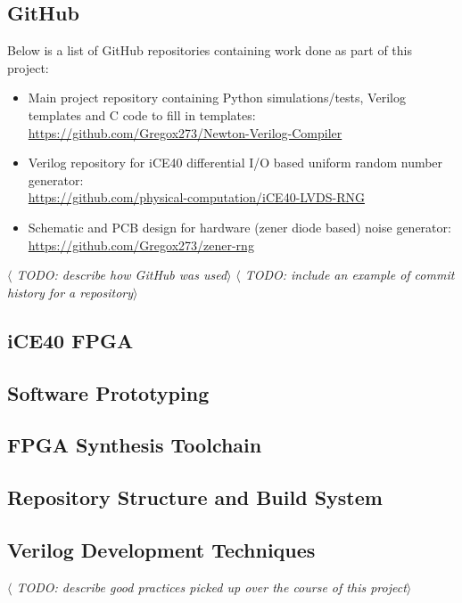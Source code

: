 \documentclass[12pt]{article}
\begin{document}
  \subsection{GitHub} \label{subsection:GitHub}
    Below is a list of GitHub repositories containing work done as part of this project:
    \begin{itemize}
        \item Main project repository containing Python simulations/tests, Verilog templates and C code to fill in templates:\\
        \url{https://github.com/Gregox273/Newton-Verilog-Compiler}
        \item Verilog repository for iCE40 differential I/O based uniform random number generator:\\
        \url{https://github.com/physical-computation/iCE40-LVDS-RNG}
        \item Schematic and PCB design for hardware (zener diode based) noise generator:\\
        \url{https://github.com/Gregox273/zener-rng}

    \end{itemize}
    \textit{$\langle$ TODO: describe how GitHub was used$\rangle$}
    \textit{$\langle$ TODO: include an example of commit history for a repository$\rangle$}

  \subsection{iCE40 FPGA}

  \subsection{Software Prototyping}

  \subsection{FPGA Synthesis Toolchain}

  \subsection{Repository Structure and Build System}

  \subsection{Verilog Development Techniques}
    \textit{$\langle$ TODO: describe good practices picked up over the course of this project$\rangle$}
\end{document}
